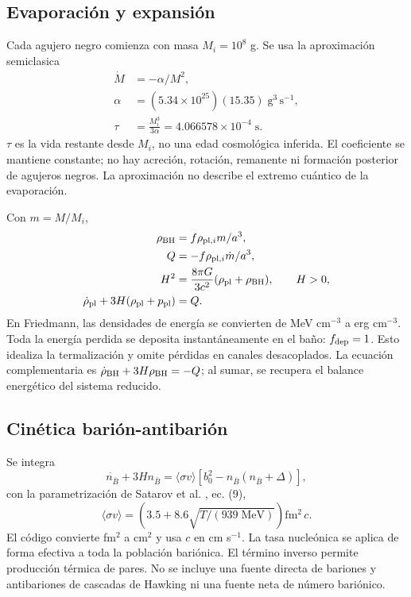 \documentclass[10pt,twocolumn,a4paper]{article}
\newcommand{\nb}{{n_{\bar B}}}
\begin{document}
\subsection{Evaporación y expansión}
Cada agujero negro comienza con masa $M_i=10^8$ g. Se usa la aproximación semiclasica \cite{cai}
\begin{align}
\dot M&=-\alpha/M^2,\\
\alpha&=(5.34\times10^{25})(15.35)\;\mathrm{g^3\,s^{-1}},\\
\tau&=\frac{M_i^3}{3\alpha}=4.066578\times10^{-4}\;\mathrm{s}.
\end{align}
$\tau$ es la vida restante desde $M_i$, no una edad cosmológica inferida. El coeficiente se mantiene constante; no hay acreción, rotación, remanente ni formación posterior de agujeros negros. La aproximación no describe el extremo cuántico de la evaporación.

Con $m=M/M_i$,
\begin{align}
\rho_{\rm BH}&=f\rho_{{\rm pl},i}m/a^3,\\
Q&=-f\rho_{{\rm pl},i}\dot m/a^3,\\
H^2&=\frac{8\pi G}{3c^2}(\rho_{\rm pl}+\rho_{\rm BH}),\qquad H>0,\\
\dot\rho_{\rm pl}+3H(\rho_{\rm pl}+p_{\rm pl})&=Q.
\end{align}
En Friedmann, las densidades de energía se convierten de MeV cm$^{-3}$ a erg cm$^{-3}$. Toda la energía perdida se deposita instantáneamente en el baño: $f_{\rm dep}=1$. Esto idealiza la termalización y omite pérdidas en canales desacoplados. La ecuación complementaria es $\dot\rho_{\rm BH}+3H\rho_{\rm BH}=-Q$; al sumar, se recupera el balance energético del sistema reducido.

\subsection{Cinética barión-antibarión}
Se integra
\begin{equation}
\dot\nb+3H\nb=\langle\sigma v\rangle\left[b_0^2-\nb(\nb+\Delta)\right],
\end{equation}
con la parametrización de Satarov et al. \cite{satarov}, ec. (9),
\begin{equation}
\langle\sigma v\rangle=\left(3.5+8.6\sqrt{T/(939\;\mathrm{MeV})}\right)\mathrm{fm^2}\,c.
\end{equation}
El código convierte fm$^2$ a cm$^2$ y usa $c$ en cm s$^{-1}$. La tasa nucleónica se aplica de forma efectiva a toda la población bariónica. El término inverso permite producción térmica de pares. No se incluye una fuente directa de bariones y antibariones de cascadas de Hawking ni una fuente neta de número bariónico.
\end{document}
